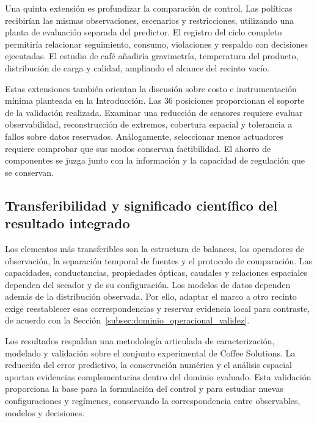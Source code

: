Una quinta extensión es profundizar la comparación de control. Las políticas recibirían las mismas observaciones, escenarios y restricciones, utilizando una planta de evaluación separada del predictor. El registro del ciclo completo permitiría relacionar seguimiento, consumo, violaciones y respaldo con decisiones ejecutadas. El estudio de café añadiría gravimetría, temperatura del producto, distribución de carga y calidad, ampliando el alcance del recinto vacío.

Estas extensiones también orientan la discusión sobre costo e instrumentación mínima planteada en la Introducción. Las $36$ posiciones proporcionan el soporte de la validación realizada. Examinar una reducción de sensores requiere evaluar observabilidad, reconstrucción de extremos, cobertura espacial y tolerancia a fallos sobre datos reservados. Análogamente, seleccionar menos actuadores requiere comprobar que sus modos conservan factibilidad. El ahorro de componentes se juzga junto con la información y la capacidad de regulación que se conservan.

\subsection{Transferibilidad y significado científico del resultado integrado}

Los elementos más transferibles son la estructura de balances, los operadores de observación, la separación temporal de fuentes y el protocolo de comparación. Las capacidades, conductancias, propiedades ópticas, caudales y relaciones espaciales dependen del secador y de su configuración. Los modelos de datos dependen además de la distribución observada. Por ello, adaptar el marco a otro recinto exige reestablecer esas correspondencias y reservar evidencia local para contraste, de acuerdo con la Sección~\ref{subsec:dominio_operacional_validez}.

Los resultados respaldan una metodología articulada de caracterización, modelado y validación sobre el conjunto experimental de Coffee Solutions. La reducción del error predictivo, la conservación numérica y el análisis espacial aportan evidencias complementarias dentro del dominio evaluado. Esta validación proporciona la base para la formulación del control y para estudiar nuevas configuraciones y regímenes, conservando la correspondencia entre observables, modelos y decisiones.
\FloatBarrier
